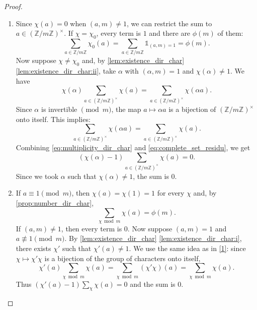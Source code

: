 \begin{proof}\leavevmode
    \begin{enumerate}[label={\roman*)}]
        \item\label{1} Since $\chi(a) = 0$ when $(a,m) \neq 1$, we can restrict the sum to $a \in \left(\mathbb{Z} / m \mathbb{Z}\right)^{\times}$. If $\chi = \chi_0$, every term is $1$ and there are $\phi(m)$ of them:
            \begin{equation*}
                \sum_{a \in \mathbb{Z} / m \mathbb{Z}} \chi_0(a)=  \sum_{a \in \mathbb{Z} / m \mathbb{Z}} \mathds{1}_{(a,m)=1} = \phi(m).
            \end{equation*}
            Now suppose $\chi \neq \chi_0$ and, by \cref{lem:existence_dir_char} \ref{lem:existence_dir_char:ii}, take $\alpha$ with $(\alpha,m) = 1$ and $\chi(\alpha) \neq 1$. We have
            \begin{equation}\label{eq:multiplicity_dir_char}
                \chi(\alpha)\sum_{a \in \left(\mathbb{Z} / m \mathbb{Z}\right)^{\times}} \chi(a) = \sum_{a \in \left(\mathbb{Z} / m \mathbb{Z}\right)^{\times}} \chi(\alpha a).
            \end{equation}
            Since $\alpha$ is invertible $\pmod m$, the map $a \mapsto \alpha a$ is a bijection of $\left(\mathbb{Z} / m \mathbb{Z}\right)^{\times}$ onto itself. This implies:
            \begin{equation}\label{eq:complete_set_residu}
                \sum_{a \in \left(\mathbb{Z} / m \mathbb{Z}\right)^{\times}} \chi(\alpha a)= \sum_{a \in \left(\mathbb{Z} / m \mathbb{Z}\right)^{\times}} \chi(a).
            \end{equation}
            Combining \cref{eq:multiplicity_dir_char} and \cref{eq:complete_set_residu}, we get
            \begin{equation*}
                (\chi(\alpha)-1)\sum_{a \in \left(\mathbb{Z} / m \mathbb{Z}\right)^{\times}} \chi( a) = 0.
            \end{equation*}
            Since we took $\alpha$ such that $\chi(\alpha) \neq 1 $, the sum is $0$.
        \item If $a \equiv 1 \pmod m$, then $\chi(a) = \chi(1) = 1$ for every $\chi$ and, by \cref{prop:number_dir_char},
            \begin{equation*}
                \sum_{\chi \bmod m} \chi(a) = \phi(m).
            \end{equation*}
            If $(a,m)\neq1$, then every term is $0$. Now suppose $(a,m) = 1$ and $a\not \equiv 1 \pmod m$. By \cref{lem:existence_dir_char} \ref{lem:existence_dir_char:i}, there exists $\chi'$ such that $\chi'(a) \neq 1$. We use the same idea as in \ref{1}: since $\chi\mapsto\chi'\chi$ is a bijection of the group of characters onto itself,
            \begin{equation*}
                \chi'(a)\sum_{\chi \bmod m}\chi(a) = \sum_{\chi \bmod m} (\chi' \chi)(a)=\sum_{\chi \bmod m}  \chi(a).
            \end{equation*}
            Thus $(\chi'(a)-1)\sum_{\chi}\chi(a) = 0$ and the sum is $0$.
    \end{enumerate}
\end{proof}
